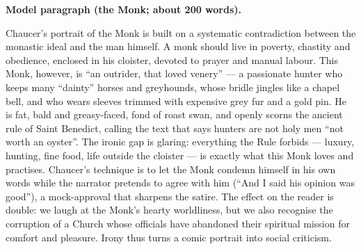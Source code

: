 \documentclass[11pt]{article}
\begin{document}
\begin{corrige}
\textbf{Model paragraph (the Monk; about 200 words).}

Chaucer's portrait of the Monk is built on a systematic contradiction between the monastic ideal and the man himself. A monk should live in poverty, chastity and obedience, enclosed in his cloister, devoted to prayer and manual labour. This Monk, however, is ``an outrider, that loved venery'' — a passionate hunter who keeps many ``dainty'' horses and greyhounds, whose bridle jingles like a chapel bell, and who wears sleeves trimmed with expensive grey fur and a gold pin. He is fat, bald and greasy-faced, fond of roast swan, and openly scorns the ancient rule of Saint Benedict, calling the text that says hunters are not holy men ``not worth an oyster''. The ironic gap is glaring: everything the Rule forbids — luxury, hunting, fine food, life outside the cloister — is exactly what this Monk loves and practises. Chaucer's technique is to let the Monk condemn himself in his own words while the narrator pretends to agree with him (``And I said his opinion was good''), a mock-approval that sharpens the satire. The effect on the reader is double: we laugh at the Monk's hearty worldliness, but we also recognise the corruption of a Church whose officials have abandoned their spiritual mission for comfort and pleasure. Irony thus turns a comic portrait into social criticism.
\end{corrige}
\end{document}
